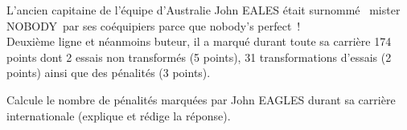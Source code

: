 \par L'ancien capitaine de l'équipe d'Australie John {\sc EALES} était surnommé \og mister NOBODY\fg\ par ses coéquipiers parce que \og nobody's perfect\fg\ !
\\ Deuxième ligne et néanmoins buteur, il a marqué durant toute sa carrière 174 points dont 2 essais non transformés (5 points), 31 transformations d'essais (2  points) ainsi que des pénalités (3 points).
\par Calcule le nombre de pénalités marquées par John {\sc EAGLES} durant sa carrière internationale (explique et rédige la réponse).